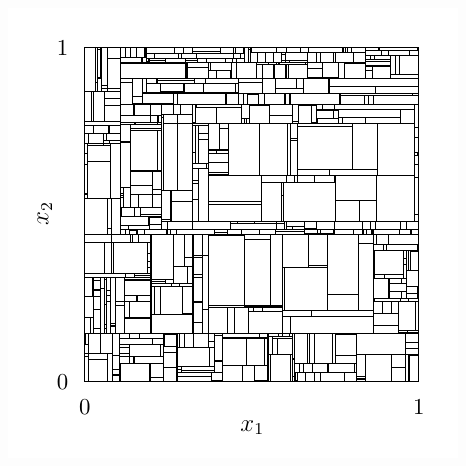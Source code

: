 \documentclass{article}
\begin{document}
\includegraphics[scale=0.5]{graphics/plot_mondrian_process_3.pdf}
\end{document}
